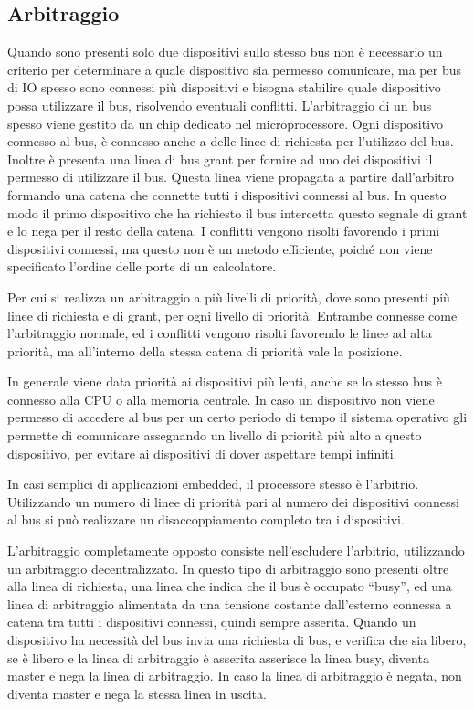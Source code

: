 \documentclass{article}
\numberwithin{equation}{subsection}
\begin{document}
\subsection{Arbitraggio}

Quando sono presenti solo due dispositivi sullo stesso bus non è necessario un criterio per determinare a quale dispositivo sia permesso comunicare, ma per bus di IO spesso 
sono connessi più dispositivi e bisogna stabilire quale dispositivo possa utilizzare il bus, risolvendo eventuali conflitti. 
L'arbitraggio di un bus spesso viene gestito da un chip dedicato nel microprocessore. Ogni dispositivo connesso al bus, è connesso anche a delle linee di richiesta per 
l'utilizzo del bus. Inoltre è presenta una linea di bus grant per fornire ad uno dei dispositivi il permesso di utilizzare il bus. Questa linea viene propagata a partire 
dall'arbitro formando una catena che connette tutti i dispositivi connessi al bus. In questo modo il primo dispositivo che ha richiesto il bus intercetta questo segnale di 
grant e lo nega per il resto della catena. 
I conflitti vengono risolti favorendo i primi dispositivi connessi, ma questo non è un metodo efficiente, poiché non viene specificato l'ordine delle porte 
di un calcolatore. 

Per cui si realizza un arbitraggio a più livelli di priorità, dove sono presenti più linee di richiesta e di grant, per ogni livello di priorità. Entrambe connesse 
come l'arbitraggio normale, ed i conflitti vengono risolti favorendo le linee ad alta priorità, ma all'interno della stessa catena di priorità vale la posizione. 

In generale viene data priorità ai dispositivi più lenti, anche se lo stesso bus è connesso alla CPU o alla memoria centrale. In caso un dispositivo non viene permesso di 
accedere al bus per un certo periodo di tempo il sistema operativo gli permette di comunicare assegnando un livello di priorità più alto a questo dispositivo, per evitare ai dispositivi 
di dover aspettare tempi infiniti. 

In casi semplici di applicazioni embedded, il processore stesso è l'arbitrio. Utilizzando un numero di linee di priorità pari al numero dei dispositivi connessi al bus si può 
realizzare un disaccoppiamento completo tra i dispositivi. 

L'arbitraggio completamente opposto consiste nell'escludere l'arbitrio, utilizzando un arbitraggio decentralizzato. In questo tipo di arbitraggio sono presenti oltre alla linea 
di richiesta, una linea che indica che il bus è occupato ``busy'', ed una linea di arbitraggio alimentata da una tensione costante dall'esterno connessa a catena tra tutti i 
dispositivi connessi, quindi sempre asserita. Quando un dispositivo ha necessità del bus invia una richiesta di bus, e verifica che sia libero, se è libero e la linea di arbitraggio è asserita 
asserisce la linea busy, diventa master e nega la linea di arbitraggio. In caso la linea di arbitraggio è negata, non diventa master e nega la stessa linea in uscita. 
\end{document}
